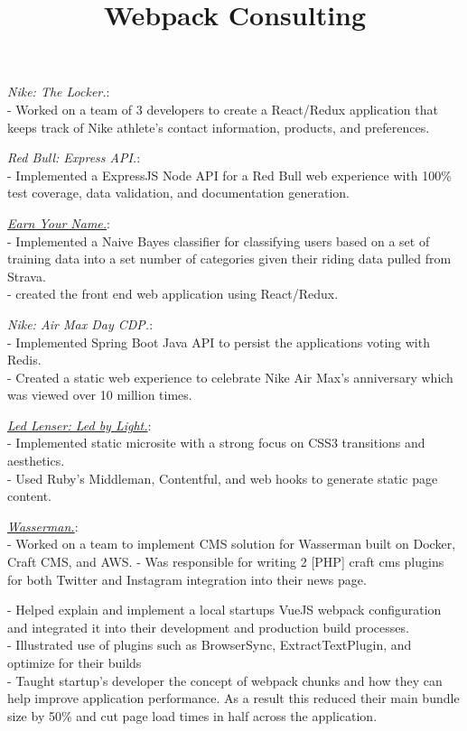 \documentclass[margin]{res}
\begin{document}
\begin{resume}
\begin{position}
\textit{Nike: The Locker.}: \\
- Worked on a team of 3 developers to create a React/Redux application that keeps track of Nike athlete's contact information, products, and preferences.
\par

\textit{Red Bull: Express API.}: \\
- Implemented a ExpressJS Node API for a Red Bull web experience with 100\% test coverage, data validation, and documentation generation.
\par

\textit{\href{http://earnyour.name/}{Earn Your Name.}}: \\
- Implemented a Naive Bayes classifier for classifying users based on a set of training data into a set number of categories given their riding data pulled from Strava.\\
- created the front end web application using React/Redux.
\par

\textit{Nike: Air Max Day CDP.}: \\
- Implemented Spring Boot Java API to persist the applications voting with Redis.\\
- Created a static web experience to celebrate Nike Air Max's anniversary which was viewed over 10 million times. 
\par

\textit{\href{https://www.ledlenserusa.com/ledbylight.html}{Led Lenser: Led by Light.}}: \\
- Implemented static microsite with a strong focus on CSS3 transitions and aesthetics.\\
- Used Ruby's Middleman, Contentful, and web hooks to generate static page content.
\par

\textit{\href{https://www.http://www.teamwass.com/}{Wasserman.}}: \\
- Worked on a team to implement CMS solution for Wasserman built on Docker, Craft CMS, and AWS.
- Was responsible for writing 2 [PHP] craft cms plugins for both Twitter and Instagram integration into their news page.
\par
\end{position}

\title{\textbf{Webpack Consulting}}
\begin{position}
- Helped explain and implement a local startups VueJS webpack configuration and integrated it into their development and production build processes. \\
- Illustrated use of plugins such as BrowserSync, ExtractTextPlugin, and optimize for their builds\\ 
- Taught startup's developer the concept of webpack chunks and how they can help improve application performance. As a result this reduced their main bundle size by 50\% and cut page load times in half across the application.
\end{position}


\end{resume}
\end{document}
